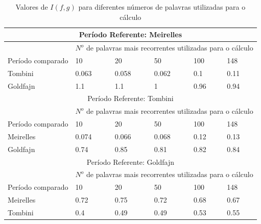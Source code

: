 \begin{table}[] 
\caption{Valores de $I(f,g)$ para diferentes números de palavras utilizadas para o cálculo}
\begin{tabular}{l|l|l|l|l|l}
\hline
\multicolumn{6}{c}{Período Referente: Meirelles}                                                  \\ \hline
                   & \multicolumn{5}{l}{$N^o$ de palavras mais recorrentes utilizadas para o cálculo} \\ \cline{2-6} 
Período comparado & 10             & 20            & 50            & 100          & 148          \\ \hline
Tombini            & 0.063          & 0.058         & 0.062         & 0.1          & 0.11         \\
Goldfajn           & 1.1            & 1.1           & 1             & 0.96         & 0.94         \\ \hline
\multicolumn{6}{c}{Período Referente: Tombini}                                                    \\ \hline
                   & \multicolumn{5}{l}{$N^o$ de palavras mais recorrentes utilizadas para o cálculo} \\ \cline{2-6} 
Período comparado & 10             & 20            & 50            & 100          & 148          \\ \hline
Meirelles          & 0.074          & 0.066         & 0.068         & 0.12         & 0.13         \\
Goldfajn           & 0.74           & 0.85          & 0.81          & 0.82         & 0.84         \\ \hline
\multicolumn{6}{c}{Período Referente: Goldfajn}                                                   \\ \hline
                   & \multicolumn{5}{l}{$N^o$ de palavras mais recorrentes utilizadas para o cálculo} \\ \cline{2-6} 
Período comparado & 10             & 20            & 50            & 100          & 148          \\ \hline
Meirelles          & 0.72           & 0.75          & 0.72          & 0.68         & 0.67         \\
Tombini            & 0.4            & 0.49          & 0.49          & 0.53         & 0.55         \\ \hline
\end{tabular}
\label{tabelageral}
\end{table}

